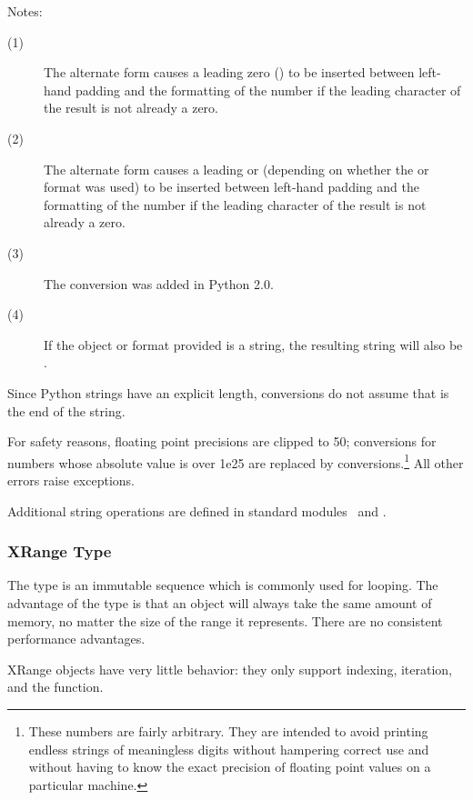 \noindent
Notes:
\begin{description}
  \item[(1)]
    The alternate form causes a leading zero () to be
    inserted between left-hand padding and the formatting of the
    number if the leading character of the result is not already a
    zero.
  \item[(2)]
    The alternate form causes a leading  or 
    (depending on whether the  or  format
    was used) to be inserted between left-hand padding and the
    formatting of the number if the leading character of the result is
    not already a zero.
  \item[(3)]
    The  conversion was added in Python 2.0.
  \item[(4)]
    If the object or format provided is a  string,
    the resulting string will also be .
\end{description}


Since Python strings have an explicit length,  conversions
do not assume that  is the end of the string.

For safety reasons, floating point precisions are clipped to 50;
 conversions for numbers whose absolute value is over 1e25
are replaced by  conversions.\footnote{
  These numbers are fairly arbitrary.  They are intended to
  avoid printing endless strings of meaningless digits without hampering
  correct use and without having to know the exact precision of floating
  point values on a particular machine.
}  All other errors raise exceptions.

Additional string operations are defined in standard modules
\ and
.


\subsubsection{XRange Type \label{typesseq-xrange}}

The  type is an immutable sequence which
is commonly used for looping.  The advantage of the 
type is that an  object will always take the same amount
of memory, no matter the size of the range it represents.  There are
no consistent performance advantages.

XRange objects have very little behavior: they only support indexing,
iteration, and the  function.


